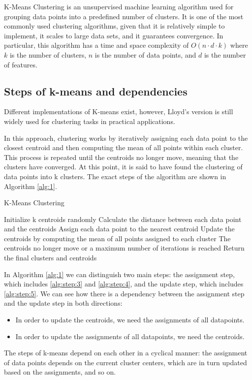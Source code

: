 K-Means Clustering is an unsupervised machine learning algorithm used for grouping data points into a predefined number of clusters. It is one of the most commonly used clustering algorithms, given that it is relatively simple to implement, it scales to large data sets, and it guarantees convergence. In particular, this algorithm has a time and space complexity of $O(n\cdot d\cdot k)$ where $k$ is the number of clusters, $n$ is the number of data points, and $d$ is the number of features.

\subsection{Steps of k-means and dependencies}

Different implementations of K-means exist, however, Lloyd's version is still widely used for clustering tasks in practical applications.

In this approach, clustering works by iteratively assigning each data point to the closest centroid and then computing the mean of all points within each cluster. This process is repeated until the centroids no longer move, meaning that the clusters have converged. At this point, it is said to have found the clustering of data points into k clusters. The exact steps of the algorithm are shown in Algorithm \ref{alg:1}.

\begin{algorithm}
\caption{K-Means Clustering}
\begin{algorithmic}[1]
    \State Initialize k centroids randomly
    \Repeat
    \State Calculate the distance between each data point and the centroids
    \label{alg:step:3}
    \State Assign each data point to the nearest centroid
    \label{alg:step:4}
    \State Update the centroids by computing the mean of all points assigned to each cluster
    \label{alg:step:5}
    \Until The centroids no longer move or a maximum number of iterations is reached
    \State Return the final clusters and centroids
\end{algorithmic}
\label{alg:1}
\end{algorithm}

In Algorithm \ref{alg:1}  we can distinguish two main steps: the assignment step, which includes \ref{alg:step:3} and \ref{alg:step:4}, and the update step, which includes \ref{alg:step:5}.
We can see how there is a dependency between the assignment step and the update step in both directions:
\begin{itemize}
    \item In order to update the centroids, we need the assignments of all datapoints.
    \item In order to update the assignments of all datapoints, we need the centroids.
\end{itemize}
The steps of k-means depend on each other in a cyclical manner: the assignment of data points depends on the current cluster centers, which are in turn updated based on the assignments, and so on.


